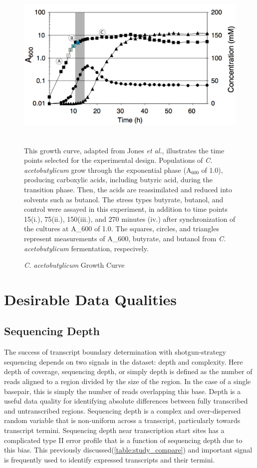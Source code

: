 \begin{figure}[t]
\small
\includegraphics[width=\textwidth,height=3in]{images/Sequencing/Growth_curve.png}
\caption{\textit{C. acetobutylicum} Growth Curve}
\label{fig:4.1}
This growth curve, adapted from Jones \textit{et al.},\cite{180} illustrates the time points selected for the experimental design. Populations of \textit{C. acetobutylicum} grow through the exponential phase (A$_{600}$ of 1.0), producing carboxylic acids, including butyric acid, during the transition phase. Then, the acids are reassimilated and reduced into solvents such as butanol. The stress types butyrate, butanol, and control were assayed in this experiment, in addition to time points 15(i.), 75(ii.), 150(iii.), and 270 minutes (iv.) after synchronization of the cultures at A_{600} of 1.0. The squares, circles, and triangles represent measurements of A_600, butyrate, and butanol from \textit{C. acetobutylicum} fermentation, respecively.\cite{180}
\end{figure}

\section{Desirable Data Qualities}
\subsection{Sequencing Depth}
The success of transcript boundary determination with shotgun-strategy sequencing depends on two signals in the dataset: depth and complexity.\cite{108,109,110,176,177} Here depth of coverage, sequencing depth, or simply depth is defined as the number of reads aligned to a region divided by the size of the region. In the case of a single basepair, this is simply the number of reads overlapping this base. Depth is a useful data quality for identifying absolute differences between fully transcribed and untranscribed regions. Sequencing depth is a complex and over-dispersed random variable\cite{52,53,181} that is non-uniform across a transcript,\cite{179} particularly towards transcript termini.\cite{18} Sequencing depth near transcription start sites has a complicated type II error profile that is a function of sequencing depth due to this bias. This previously discussed(\ref{table:study_compare}) and important signal is frequently used to identify expressed transcripts and their termini.

